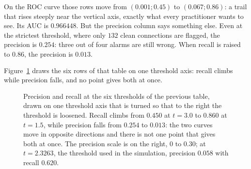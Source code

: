 On the ROC curve those rows move from $(0.001;0.45)$ to $(0.067;0.86)$: a trail that rises steeply
near the vertical axis, exactly what every practitioner wants to see. Its AUC is $0.966448$. But
the precision column says something else. Even at the strictest threshold, where only $132$ clean
connections are flagged, the precision is $0.254$: three out of four alarms are still wrong. When
recall is raised to $0.86$, the precision is $0.013$.

Figure~\ref{fig:presisi-recall-ambang} draws the six rows of that table on one threshold axis:
recall climbs while precision falls, and no point gives both at once.

\begin{figure}[htbp]
\centering
{}
\caption{Precision and recall at the six thresholds of the previous table, drawn on one threshold
axis that is turned so that to the right the threshold is loosened. Recall climbs from $0.450$ at
$t=3.0$ to $0.860$ at $t=1.5$, while precision falls from $0.254$ to $0.013$: the two curves move in
opposite directions and there is not one point that gives both at once. The precision scale is on
the right, $0$ to $0.30$; at $t=2.3263$, the threshold used in the simulation, precision $0.058$ with
recall $0.620$.}
\label{fig:presisi-recall-ambang}
\end{figure}

